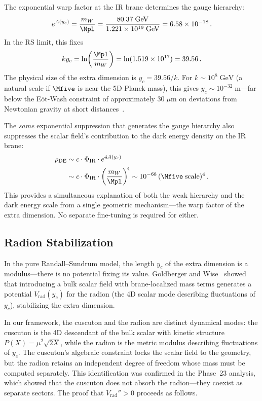 The exponential warp factor at the IR brane determines the gauge hierarchy:
\begin{equation}
\label{eq:1-hierarchy}
e^{A(y_c)} = \frac{m_W}{\Mpl} = \frac{80.37\;\mathrm{GeV}}{1.221 \times 10^{19}\;\mathrm{GeV}} = 6.58 \times 10^{-18}\,.
\end{equation}
In the RS limit, this fixes
\begin{equation}
\label{eq:1-kyc}
ky_c = \ln\!\left(\frac{\Mpl}{m_W}\right) = \ln(1.519 \times 10^{17}) = 39.56\,.
\end{equation}
The physical size of the extra dimension is $y_c = 39.56/k$. For $k \sim 10^8\;\mathrm{GeV}$ (a natural scale if $\Mfive$ is near the 5D Planck mass), this gives $y_c \sim 10^{-32}\;\mathrm{m}$---far below the E\"{o}t-Wash constraint of approximately $30\;\mu\mathrm{m}$ on deviations from Newtonian gravity at short distances~\cite{ch1:kapner07}.

The \emph{same} exponential suppression that generates the gauge hierarchy also suppresses the scalar field's contribution to the dark energy density on the IR brane:
\begin{align}
\label{eq:1-rho-de}
\rho_{\mathrm{DE}} &\sim c \cdot \Phi_{\mathrm{IR}} \cdot e^{4A(y_c)} \notag\\
  &\sim c \cdot \Phi_{\mathrm{IR}} \cdot \left(\frac{m_W}{\Mpl}\right)^{\!4}
  \sim 10^{-68}\, (\Mfive\;\text{scale})^4\,.
\end{align}
This provides a simultaneous explanation of both the weak hierarchy and the dark energy scale from a single geometric mechanism---the warp factor of the extra dimension. No separate fine-tuning is required for either.

\subsection{Radion Stabilization}
\label{sec:1-radion}

In the pure Randall--Sundrum model, the length $y_c$ of the extra dimension is a modulus---there is no potential fixing its value. Goldberger and Wise~\cite{ch1:goldberger99} showed that introducing a bulk scalar field with brane-localized mass terms generates a potential $V_{\mathrm{rad}}(y_c)$ for the radion (the 4D scalar mode describing fluctuations of $y_c$), stabilizing the extra dimension.

In our framework, the cuscuton and the radion are distinct dynamical modes: the cuscuton is the 4D descendant of the bulk scalar with kinetic structure $P(X) = \mu^2\sqrt{2X}$, while the radion is the metric modulus describing fluctuations of $y_c$. The cuscuton's algebraic constraint locks the scalar field to the geometry, but the radion retains an independent degree of freedom whose mass must be computed separately. This identification was confirmed in the Phase~23 analysis, which showed that the cuscuton does not absorb the radion---they coexist as separate sectors. The proof that $V_{\mathrm{rad}}'' > 0$ proceeds as follows.

